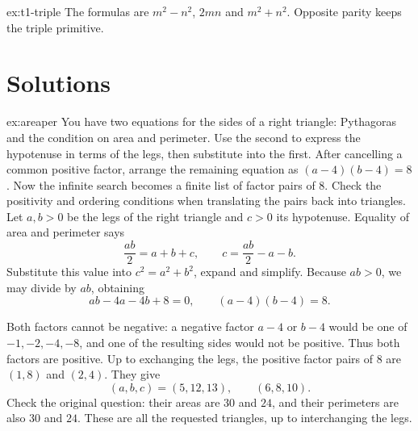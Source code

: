 \begin{hint}{ex:t1-triple}
The formulas are $m^2-n^2$, $2mn$ and $m^2+n^2$. Opposite parity keeps the triple primitive.
\end{hint}

\section{Solutions}

\begin{solution}{ex:areaper}
\idea You have two equations for the sides of a right triangle: Pythagoras and the condition on area and perimeter. Use the second to express the hypotenuse in terms of the legs, then substitute into the first. After cancelling a common positive factor, arrange the remaining equation as $(a-4)(b-4)=8$. Now the infinite search becomes a finite list of factor pairs of $8$. Check the positivity and ordering conditions when translating the pairs back into triangles.
\writeup Let $a,b>0$ be the legs of the right triangle and $c>0$ its hypotenuse. Equality of area and perimeter says
\[
\frac{ab}{2}=a+b+c,\qquad
c=\frac{ab}{2}-a-b.
\]
Substitute this value into $c^2=a^2+b^2$, expand and simplify. Because $ab>0$, we may divide by $ab$, obtaining
\[
ab-4a-4b+8=0,\qquad
(a-4)(b-4)=8.
\]

Both factors cannot be negative: a negative factor $a-4$ or $b-4$ would be one of $-1,-2,-4,-8$, and one of the resulting sides would not be positive. Thus both factors are positive. Up to exchanging the legs, the positive factor pairs of $8$ are $(1,8)$ and $(2,4)$. They give
\[
(a,b,c)=(5,12,13),\qquad(6,8,10).
\]
Check the original question: their areas are $30$ and $24$, and their perimeters are also $30$ and $24$. These are all the requested triangles, up to interchanging the legs.
\end{solution}

